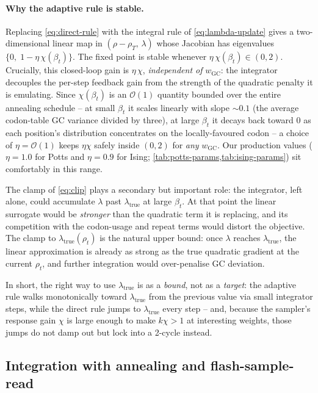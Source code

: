 \documentclass[11pt]{article}
\begin{document}
\paragraph{Why the adaptive rule is stable.}
Replacing \cref{eq:direct-rule} with the integral rule of \cref{eq:lambda-update} gives a two-dimensional linear map in $(\rho - \rho_T,\,\lambda)$ whose Jacobian has eigenvalues $\{0,\;1 - \eta\,\chi(\beta_t)\}$.
The fixed point is stable whenever $\eta\,\chi(\beta_t) \in (0, 2)$.
Crucially, this closed-loop gain is $\eta\,\chi$, \emph{independent of} $w_{\mathrm{GC}}$: the integrator decouples the per-step feedback gain from the strength of the quadratic penalty it is emulating.
Since $\chi(\beta_t)$ is an $\mathcal O(1)$ quantity bounded over the entire annealing schedule -- at small $\beta_t$ it scales linearly with slope ${\sim}0.1$ (the average codon-table GC variance divided by three), at large $\beta_t$ it decays back toward $0$ as each position's distribution concentrates on the locally-favoured codon -- a choice of $\eta = \mathcal O(1)$ keeps $\eta\chi$ safely inside $(0, 2)$ for \emph{any} $w_{\mathrm{GC}}$. Our production values ($\eta = 1.0$ for Potts and $\eta = 0.9$ for Ising; \cref{tab:potts-params,tab:ising-params}) sit comfortably in this range.

The clamp of \cref{eq:clip} plays a secondary but important role: the integrator, left alone, could accumulate $\lambda$ past $\lambda_{\mathrm{true}}$ at large $\beta_t$.
At that point the linear surrogate would be \emph{stronger} than the quadratic term it is replacing, and its competition with the codon-usage and repeat terms would distort the objective.
The clamp to $\lambda_{\mathrm{true}}(\rho_t)$ is the natural upper bound: once $\lambda$ reaches $\lambda_{\mathrm{true}}$, the linear approximation is already as strong as the true quadratic gradient at the current $\rho_t$, and further integration would over-penalise GC deviation.

In short, the right way to use $\lambda_{\mathrm{true}}$ is as a \emph{bound}, not as a \emph{target}: the adaptive rule walks monotonically toward $\lambda_{\mathrm{true}}$ from the previous value via small integrator steps, while the direct rule jumps to $\lambda_{\mathrm{true}}$ every step -- and, because the sampler's response gain $\chi$ is large enough to make $k\chi > 1$ at interesting weights, those jumps do not damp out but lock into a 2-cycle instead.

\subsection*{Integration with annealing and flash-sample-read}
\end{document}
